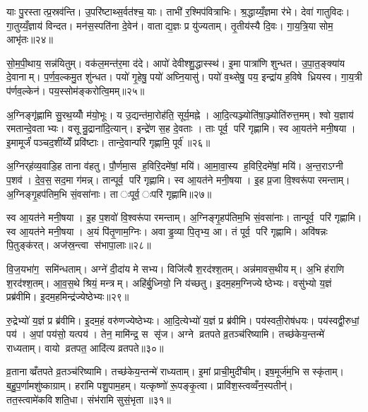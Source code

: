 याः पु॒रस्तात्प्र॒स्रव॑न्ति। उ॒परि॑ष्टाथ्स॒र्वत॑श्च॒ याः। ताभी॑ र॒श्मिप॑वित्राभिः। श्र॒द्धाय्यँ॒ज्ञमा र॑भे। देवा॑ गातुविदः। गा॒तुय्यँ॒ज्ञाय॑ विन्दत। मन॑स॒स्पति॑ना दे॒वेन॑। वाताद्य॒ज्ञः प्र यु॑ज्यताम्। तृ॒तीय॑स्यै दि॒वः। गा॒य॒त्रि॒या सोम॒ आभृ॑तः॥२४॥

सो॒म॒पी॒थाय॒ सन्न॑यितुम्। वक॑ल॒मन्त॑र॒मा द॑दे। आपो॑ देवीश्शु॒द्धास्स्थ॑। इ॒मा पात्रा॑णि शुन्धत। उ॒पा॒त॒ङ्क्या॑य दे॒वानाम्। प॒र्ण॒व॒ल्कमु॒त शु॑न्धत। पयो॑ गृ॒हेषु॒ पयो॑ अघ्नि॒यासु॑। पयो॑ व॒थ्सेषु॒ पय॒ इन्द्रा॑य ह॒विषे ध्रियस्व। गा॒य॒त्री प॑र्णव॒ल्केन॑। पय॒स्सोम॑ङ्करोत्वि॒मम्॥२५॥

अ॒ग्निङ्गृ॑ह्णामि सु॒रथ॒य्योँ म॑यो॒भूः। य उ॒द्यन्त॑मा॒रोह॑ति॒ सूर्य॒मह्ने। आ॒दि॒त्यञ्ज्योति॑षा॒ञ्ज्योति॑रुत्त॒मम्। श्वो य॒ज्ञाय॑ रमतान्दे॒वताभ्यः। वसून्रु॒द्राना॑दि॒त्यान्। इन्द्रे॑ण स॒ह दे॒वताः। ताः पूर्व॒ परि॑ गृह्णामि। स्व आ॒यत॑ने मनी॒षया। इ॒मामूर्जं॑ पञ्चद॒शींय्येँ प्रवि॑ष्टाः। तान्दे॒वान्परि॑ गृह्णामि॒ पूर्व॑॥२६॥

अ॒ग्निर्‌ह॑व्य॒वाडि॒ह ताना व॑हतु। पौ॒र्णमा॒स ह॒विरि॒दमे॑षां॒ मयि॑। आ॒मा॒वा॒स्य ह॒विरि॒दमे॑षां॒ मयि॑। अ॒न्त॒राऽग्नी प॒शव॑। दे॒व॒स॒सद॒मा ग॑मन्न्। तान्पूर्व॒ परि॑ गृह्णामि। स्व आ॒यत॑ने मनी॒षया। इ॒ह प्र॒जा वि॒श्वरू॑पा रमन्ताम्। अ॒ग्निङ्गृ॒हप॑तिम॒भि सं॒वसा॑नाः। ता ःपूर्व॒ ःपरि॑ गृह्णामि॥२७॥

स्व आ॒यत॑ने मनी॒षया। इ॒ह प॒शवो॑ वि॒श्वरू॑पा रमन्ताम्। अ॒ग्निङ्गृ॒हप॑तिम॒भि सं॒वसा॑नाः। तान्पूर्व॒ परि॑ गृह्णामि। स्व आ॒यत॑ने मनी॒षया। अ॒यं पि॑तृ॒णाम॒ग्निः। अवाड्ढ॒व्या पि॒तृभ्य॒ आ। तं पूर्व॒ परि॑ गृह्णामि। अवि॑षन्नः पि॒तुङ्क॑रत्। अज॑स्र॒न्त्वा स॑भापा॒लाः॥२८॥

वि॒ज॒यभा॑ग॒ समि॑न्धताम्। अग्ने॑ दी॒दा॑य मे सभ्य। विजि॑त्यै श॒रद॑श्श॒तम्। अन्न॑मावस॒थीयम्। अ॒भि ह॑राणि श॒रद॑श्श॒तम्। आ॒व॒स॒थे श्रियं॒ मन्त्रम्। अहि॑र्बु॒ध्नियो॒ नि य॑च्छतु। इ॒दम॒हम॒ग्निज्येष्ठेभ्यः। वसु॑भ्यो य॒ज्ञं प्रब्र॑वीमि। इ॒दम॒हमिन्द्र॑ज्येष्ठेभ्यः॥२९॥

रु॒द्रेभ्यो॑ य॒ज्ञं प्र ब्र॑वीमि। इ॒दम॒हं वरु॑णज्येष्ठेभ्यः। आ॒दि॒त्येभ्यो॑ य॒ज्ञं प्र ब्र॑वीमि। पय॑स्वती॒रोष॑धयः। पय॑स्वद्वी॒रुधां॒ पय॑। अ॒पां पय॑सो॒ यत्पय॑। तेन॒ मामि॑न्द्र॒ स सृ॑ज। अग्ने व्रतपते व्र॒तञ्च॑रिष्यामि। तच्छ॑केय॒न्तन्मे॑ राध्यताम्। वायो व्रतपत॒ आदि॑त्य व्रतपते॥३०॥

व्र॒तानाव्व्रँतपते व्र॒तञ्च॑रिष्यामि। तच्छ॑केय॒न्तन्मे॑ राध्यताम्। इ॒मां प्राची॒मुदी॑चीम्। इष॒मूर्ज॑म॒भि सस्कृ॑ताम्। ब॒हु॒प॒र्णामशु॑ष्काग्राम्। हरा॑मि पशु॒पाम॒हम्। यत्कृष्णो॑ रू॒पङ्कृ॒त्वा। प्रावि॑श॒स्त्वव्वँन॒स्पतीन्॑। तत॒स्त्वामे॑कविशति॒धा। संभ॑रामि सुसं॒भृता॥३१॥

